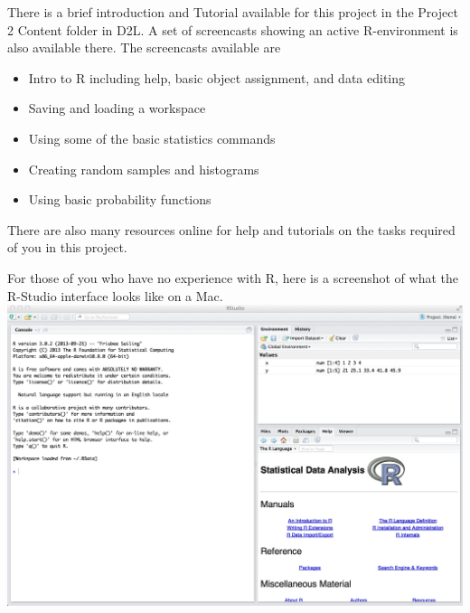 \documentclass{article}
\begin{document}
There is a brief introduction and Tutorial available for this project in the Project 2 Content folder in D2L. A set of screencasts showing an active R-environment is also available there. The screencasts available are
	\begin{itemize}
	\item Intro to R including help, basic object assignment, and data editing %
	\item Saving and loading a workspace
	\item Using some of the basic statistics commands %
	\item Creating random samples and histograms %
	\item Using basic probability functions %
	\end{itemize}

There are also many resources online for help and tutorials on the tasks required of you in this project.

\newpage 
For those of you who have no experience with R, here is a screenshot of what the R-Studio interface looks like on a Mac. \\
\includegraphics[scale=0.3]{RStudio.jpg}

\newpage
\end{document}
